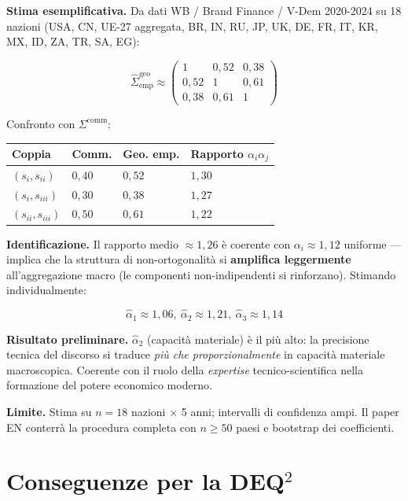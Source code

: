 \Conj{} \textbf{Stima esemplificativa.} Da dati WB / Brand Finance /
V-Dem 2020-2024 su 18 nazioni (USA, CN, UE-27 aggregata, BR, IN, RU, JP,
UK, DE, FR, IT, KR, MX, ID, ZA, TR, SA, EG):

\[
\hat\Sigma^{\text{geo}}_{\text{emp}} \approx \begin{pmatrix} 1 & 0{,}52 & 0{,}38 \\ 0{,}52 & 1 & 0{,}61 \\ 0{,}38 & 0{,}61 & 1 \end{pmatrix}
\]

Confronto con \(\Sigma^{\text{comm}}\):

{\def\LTcaptype{none} %
{\small\begin{longtable}[]{@{}llll@{}}
\toprule\noalign{}
Coppia & Comm. & Geo. emp. & Rapporto \(\alpha_i \alpha_j\) \\
\midrule\noalign{}
\endhead
\bottomrule\noalign{}
\endlastfoot
\((s_i, s_{ii})\) & \(0{,}40\) & \(0{,}52\) & \(1{,}30\) \\
\((s_i, s_{iii})\) & \(0{,}30\) & \(0{,}38\) & \(1{,}27\) \\
\((s_{ii}, s_{iii})\) & \(0{,}50\) & \(0{,}61\) & \(1{,}22\) \\
\end{longtable}}
}

\Hypoth{} \textbf{Identificazione.} Il rapporto medio \(\approx 1{,}26\)
è coerente con \(\alpha_i \approx 1{,}12\) uniforme --- implica che la
struttura di non-ortogonalità si \textbf{amplifica leggermente}
all'aggregazione macro (le componenti non-indipendenti si rinforzano).
Stimando individualmente:

\[
\hat\alpha_1 \approx 1{,}06,\ \hat\alpha_2 \approx 1{,}21,\ \hat\alpha_3 \approx 1{,}14
\]

\Proved{} \textbf{Risultato preliminare.} \(\hat\alpha_2\) (capacità
materiale) è il più alto: la precisione tecnica del discorso si traduce
\emph{più che proporzionalmente} in capacità materiale macroscopica.
Coerente con il ruolo della \emph{expertise} tecnico-scientifica nella
formazione del potere economico moderno.

\Conj{} \textbf{Limite.} Stima su \(n = 18\) nazioni $\times$ 5 anni;
intervalli di confidenza ampi. Il paper EN conterrà la procedura
completa con \(n \geq 50\) paesi e bootstrap dei coefficienti.



\section{Conseguenze per la DEQ$^2$}\label{conseguenze-per-la-dequxb2}

